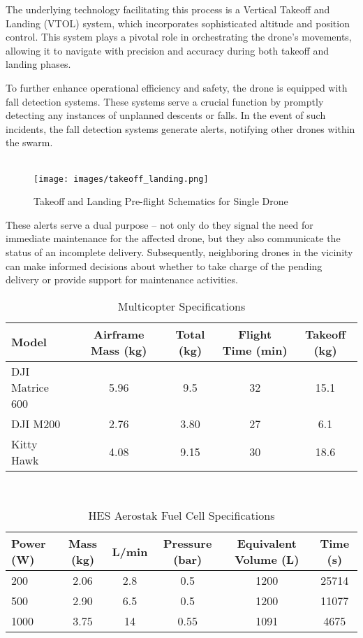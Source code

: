 \documentclass[preprint,12pt]{elsarticle}
\begin{document}
The underlying technology facilitating this process is a Vertical Takeoff and Landing (VTOL) system, which incorporates sophisticated altitude and position control. This system plays a pivotal role in orchestrating the drone's movements, allowing it to navigate with precision and accuracy during both takeoff and landing phases.

To further enhance operational efficiency and safety, the drone is equipped with fall detection systems. These systems serve a crucial function by promptly detecting any instances of unplanned descents or falls. In the event of such incidents, the fall detection systems generate alerts, notifying other drones within the swarm.\\\\

\begin{figure}[!htbp]
    \centering
    \texttt{[image: images/takeoff\_landing.png]}
    \caption{Takeoff and Landing Pre-flight Schematics for Single Drone}
\end{figure}

These alerts serve a dual purpose – not only do they signal the need for immediate maintenance for the affected drone, but they also communicate the status of an incomplete delivery. Subsequently, neighboring drones in the vicinity can make informed decisions about whether to take charge of the pending delivery or provide support for maintenance activities.

\begin{table}[htbp]
  \centering
  \caption{Multicopter Specifications}
  \begin{tabular}{lcccc}
    \toprule
    Model & Airframe Mass (kg) & Total (kg) & Flight Time (min) & Takeoff (kg) \\
    \midrule
    DJI Matrice 600 & 5.96 & 9.5 & 32 & 15.1 \\
    DJI M200 & 2.76 & 3.80 & 27 & 6.1 \\
    Kitty Hawk & 4.08 & 9.15 & 30 & 18.6 \\
    \bottomrule
  \end{tabular}
\end{table}\\

\begin{table}[htbp]
  \centering
  \caption{HES Aerostak Fuel Cell Specifications}
  \begin{tabular}{lccccc}
    \toprule
    Power (W) & Mass (kg) & L/min & Pressure (bar) & Equivalent Volume (L) & Time (s) \\
    \midrule
    200 & 2.06 & 2.8 & 0.5 & 1200 & 25714 \\
    500 & 2.90 & 6.5 & 0.5 & 1200 & 11077 \\
    1000 & 3.75 & 14 & 0.55 & 1091 & 4675 \\
    \bottomrule
  \end{tabular}
\end{table}\\
\end{document}
